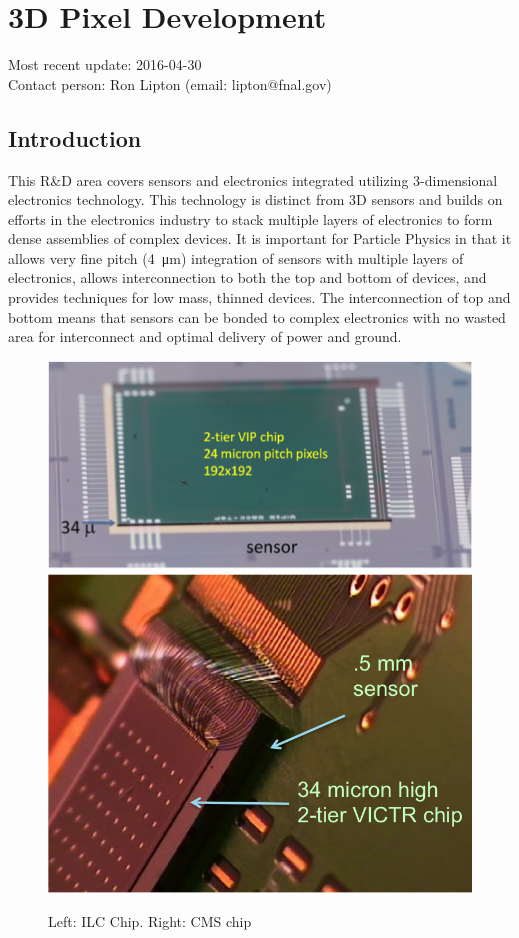 \section{3D Pixel Development}
Most recent update: 2016-04-30 \\
Contact person: Ron Lipton (email: lipton@fnal.gov)
\subsection{Introduction}
This R\&D area covers sensors and electronics integrated utilizing 3-dimensional electronics technology.  This technology is distinct from 3D sensors and builds on efforts in the electronics industry to stack multiple layers of electronics to form dense assemblies of complex devices.  It is important for Particle Physics in that it allows very fine pitch (\SI{4}{\micro\meter}) integration of sensors with multiple layers of electronics, allows interconnection to both the top and bottom of devices, and provides techniques for low mass, thinned devices. The interconnection of top and bottom means that sensors can be bonded to complex electronics with no wasted area for interconnect and optimal delivery of power and ground.

\begin{figure}[hb]
    \centering
    \includegraphics[width=.57\textwidth]{VertexDetector/VIP/ILCChip}
    \includegraphics[width=.37\textwidth]{VertexDetector/VIP/CMSChip}
    \caption{Left: ILC Chip. Right: CMS chip}
    \label{fig:VertexDetector:VIP:variants}
\end{figure}

